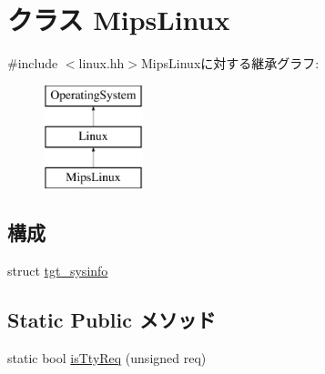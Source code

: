 \hypertarget{classMipsLinux}{
\section{クラス MipsLinux}
\label{classMipsLinux}
}


{\ttfamily \#include $<$linux.hh$>$}MipsLinuxに対する継承グラフ:\begin{figure}[H]
\begin{center}
\leavevmode
\includegraphics[height=3cm]{classMipsLinux}
\end{center}
\end{figure}
\subsection*{構成}
\begin{DoxyCompactItemize}
\item 
struct \hyperlink{structMipsLinux_1_1tgt__sysinfo}{tgt\_\-sysinfo}
\end{DoxyCompactItemize}
\subsection*{Static Public メソッド}
\begin{DoxyCompactItemize}
\item 
static bool \hyperlink{classMipsLinux_ab20bdd4422ecf6e1736a5587be296b3f}{isTtyReq} (unsigned req)
\end{DoxyCompactItemize}
